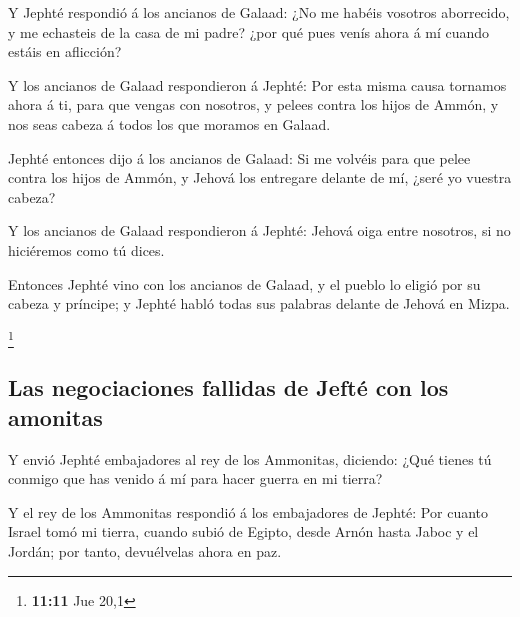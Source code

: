  Y Jephté respondió á los ancianos de Galaad: ¿No me
habéis vosotros aborrecido, y me echasteis de la casa de mi padre? ¿por
qué pues venís ahora á mí cuando estáis en aflicción?

 Y los ancianos de Galaad respondieron á Jephté: Por esta
misma causa tornamos ahora á ti, para que vengas con nosotros, y pelees
contra los hijos de Ammón, y nos seas cabeza á todos los que moramos en
Galaad.

 Jephté entonces dijo á los ancianos de Galaad: Si me
volvéis para que pelee contra los hijos de Ammón, y Jehová los entregare
delante de mí, ¿seré yo vuestra cabeza?

 Y los ancianos de Galaad respondieron á Jephté: Jehová
oiga entre nosotros, si no hiciéremos como tú dices.

 Entonces Jephté vino con los ancianos de Galaad, y el
pueblo lo eligió por su cabeza y príncipe; y Jephté habló todas sus
palabras delante de Jehová en Mizpa.

\footnote{\textbf{11:11} Jue 20,1}

\hypertarget{las-negociaciones-fallidas-de-jeftuxe9-con-los-amonitas}{%
\subsection{Las negociaciones fallidas de Jefté con los
amonitas}\label{las-negociaciones-fallidas-de-jeftuxe9-con-los-amonitas}}

 Y envió Jephté embajadores al rey de los Ammonitas,
diciendo: ¿Qué tienes tú conmigo que has venido á mí para hacer guerra
en mi tierra?

 Y el rey de los Ammonitas respondió á los embajadores de
Jephté: Por cuanto Israel tomó mi tierra, cuando subió de Egipto, desde
Arnón hasta Jaboc y el Jordán; por tanto, devuélvelas ahora en paz.

